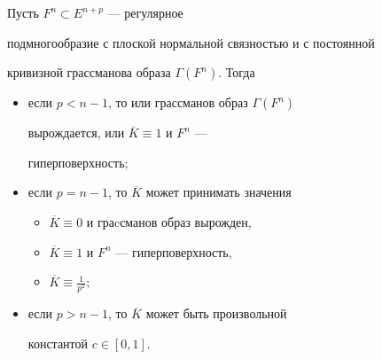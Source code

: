 \begin{thm}


Пусть $F^{n}\subset E^{n+p}$ --- регулярное


подмногообразие с плоской нормальной связностью и с постоянной


кривизной грассманова образа $\Gamma (F^{n})$. Тогда


\begin{itemize}


\item[1)] если $p < n-1$, то или грассманов образ $\Gamma (F^{n})$


вырождается, или $\overline K \equiv 1$ и $F^{n}$ ---


гиперповерхность$;$


\item[2)] если $p=n-1$, то $\overline K$ может принимать значения


\begin{itemize}


\item[] $\overline K \equiv 0$ и граcсманов образ вырожден,


\item[] $\overline K \equiv 1$ и $F^{n}$ --- гиперповерхность,


\item[] $\overline K \equiv \frac{1}{p^{2}};$


\end{itemize}


\item[3)] если $p > n-1$, то $\overline K$ может быть произвольной


константой $c \in [0, 1]$.


\end{itemize}


\end{thm}





